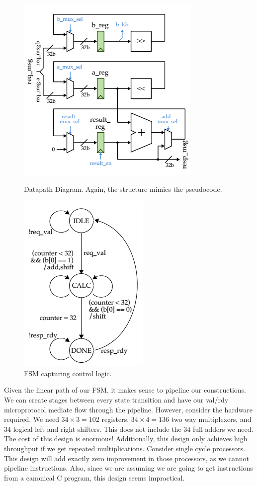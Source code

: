 \documentclass[10pt]{article}
\begin{document}
\begin{figure}[b]
    \begin{minipage}{.5\textwidth}
        \centering
        \includegraphics[scale=0.4]{Datapath}
        \caption{Datapath Diagram. Again, the structure mimics the pseudocode.}
        \label{fig:datapath}
    \end{minipage}%
    \begin{minipage}{.5\textwidth}
        \centering
        \includegraphics[scale=0.4]{BaseFSM}
        \caption{FSM capturing control logic.}
        \label{fig:BaseFSM}
    \end{minipage}
\end{figure}

Given the linear path of our FSM, it makes sense to pipeline our constructions.
We can create stages between every state transition and have our val/rdy microprotocol mediate flow through the pipeline.
However, consider the hardware required. We need $34 \times 3 = 102$ registers, $34 \times 4 = 136$ two way multiplexers,
and $34$ logical left and right shifters.
This does not include the $34$ full adders we need. 
The cost of this design is enormous!
Additionally, this design only achieves high throughput if we get repeated multiplications.
Consider single cycle processors.
This design will add exactly zero improvement in those processors, as we cannot pipeline instructions. 
Also, since we are assuming we are going to get instructions from a canonical C program, this design seems impractical.
\end{document}
